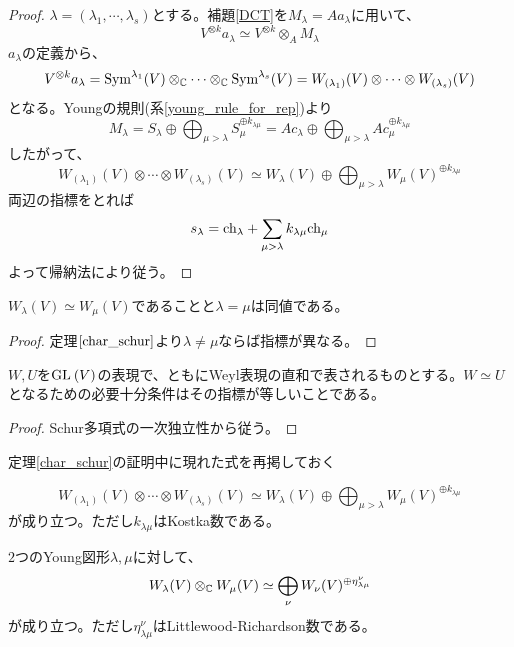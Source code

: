 \documentclass{ltjsreport}
\begin{document}
\begin{proof}
  $\lambda=(\lambda_1,\cdots,\lambda_s)$とする。補題\ref{DCT}を$M_\lambda=Aa_\lambda$に用いて、
  \[
  V^{\otimes k}a_\lambda\simeq V^{\otimes k}\otimes_AM_\lambda  
  \]
  $a_\lambda$の定義から、
  \[
  V^{\otimes k}a_\lambda
  =\text{Sym}^{\lambda_1}(V)\otimes_{\mathbb{C}}\cdots\otimes_{\mathbb{C}}\text{Sym}^{\lambda_s}(V)
  =W_{(\lambda_1)}(V)\otimes\cdots\otimes W_{(\lambda_s)}(V)
  \]
  となる。Youngの規則(系\ref{young_rule_for_rep})より
  \[
  M_\lambda
  =S_\lambda\oplus\bigoplus_{\mu>\lambda}S_\mu^{\oplus k_{\lambda\mu}}
  =Ac_\lambda\oplus\bigoplus_{\mu>\lambda}Ac_\mu^{\oplus k_{\lambda\mu}}
  \]
  したがって、
  \[
  W_{(\lambda_1)}(V)\otimes\cdots\otimes W_{(\lambda_s)}(V)
  \simeq 
  W_\lambda(V)\oplus\bigoplus_{\mu>\lambda}W_{\mu}(V)^{\oplus k_{\lambda\mu}}
  \]
  両辺の指標をとれば
  \[
  s_\lambda=\text{ch}_\lambda+\sum_{\mu>\lambda}k_{\lambda\mu}\text{ch}_\mu  
  \]
  よって帰納法により従う。
\end{proof}

\begin{cor}
  $W_\lambda(V)\simeq W_\mu(V)$であることと$\lambda=\mu$は同値である。
\end{cor}

\begin{proof}
  定理$\ref{char_schur}$より$\lambda\neq\mu$ならば指標が異なる。
\end{proof}

\begin{cor}
  $W,U$を$\text{GL}\:(V)$の表現で、ともにWeyl表現の直和で表されるものとする。$W\simeq U$となるための必要十分条件はその指標が等しいことである。
\end{cor}

\begin{proof}
  Schur多項式の一次独立性から従う。
\end{proof}

定理\ref{char_schur}の証明中に現れた式を再掲しておく

\begin{cor}[Youngの規則]
  \[
  W_{(\lambda_1)}(V)\otimes\cdots\otimes W_{(\lambda_s)}(V)
  \simeq 
  W_\lambda(V)\oplus\bigoplus_{\mu>\lambda}W_{\mu}(V)^{\oplus k_{\lambda\mu}}
  \]
  が成り立つ。ただし$k_{\lambda\mu}$はKostka数である。
\end{cor}

\begin{cor}
  $2$つのYoung図形$\lambda,\mu$に対して、
  \[
  W_\lambda(V)\otimes_{\mathbb{C}}W_\mu(V)\simeq \bigoplus_\nu W_\nu(V)^{\oplus \eta^{\nu}_{\lambda\mu}}
  \]
  が成り立つ。ただし$\eta^{\nu}_{\lambda\mu}$はLittlewood-Richardson数である。
\end{cor}
\end{document}
